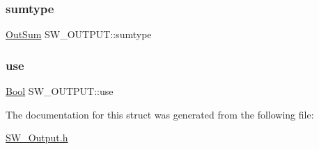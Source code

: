 \mbox{\label{struct_s_w___o_u_t_p_u_t_a2a29e58833af5162fa6dbc14c307af68}} 
\subsubsection{\texorpdfstring{sumtype}{sumtype}}
{\footnotesize\ttfamily \hyperlink{_s_w___output_8h_af6bc39c9780566b4a3891132f6977362}{Out\+Sum} S\+W\+\_\+\+O\+U\+T\+P\+U\+T\+::sumtype}

\mbox{\label{struct_s_w___o_u_t_p_u_t_a86d069d21282a56d0f4b730eba846c37}} 
\subsubsection{\texorpdfstring{use}{use}}
{\footnotesize\ttfamily \hyperlink{generic_8h_a39db6982619d623273fad8a383489309}{Bool} S\+W\+\_\+\+O\+U\+T\+P\+U\+T\+::use}



The documentation for this struct was generated from the following file\+:\begin{DoxyCompactItemize}
\item 
\hyperlink{_s_w___output_8h}{S\+W\+\_\+\+Output.\+h}\end{DoxyCompactItemize}
